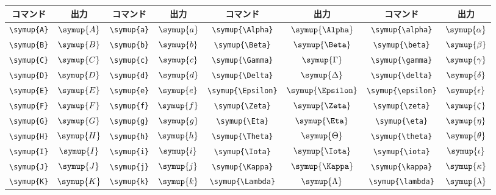 \begin{longtable}{cccccccc}
    \toprule
    コマンド         & 出力          & コマンド         & 出力          & コマンド                & 出力                 & コマンド                   & 出力                    \\
    \midrule
    \verb|\symup{A}| & \(\symup{A}\) & \verb|\symup{a}| & \(\symup{a}\) & \verb|\symup{\Alpha}|   & \(\symup{\Alpha}\)   & \verb|\symup{\alpha}|      & \(\symup{\alpha}\)      \\
    \verb|\symup{B}| & \(\symup{B}\) & \verb|\symup{b}| & \(\symup{b}\) & \verb|\symup{\Beta}|    & \(\symup{\Beta}\)    & \verb|\symup{\beta}|       & \(\symup{\beta}\)       \\
    \verb|\symup{C}| & \(\symup{C}\) & \verb|\symup{c}| & \(\symup{c}\) & \verb|\symup{\Gamma}|   & \(\symup{\Gamma}\)   & \verb|\symup{\gamma}|      & \(\symup{\gamma}\)      \\
    \verb|\symup{D}| & \(\symup{D}\) & \verb|\symup{d}| & \(\symup{d}\) & \verb|\symup{\Delta}|   & \(\symup{\Delta}\)   & \verb|\symup{\delta}|      & \(\symup{\delta}\)      \\
    \verb|\symup{E}| & \(\symup{E}\) & \verb|\symup{e}| & \(\symup{e}\) & \verb|\symup{\Epsilon}| & \(\symup{\Epsilon}\) & \verb|\symup{\epsilon}|    & \(\symup{\epsilon}\)    \\
    \verb|\symup{F}| & \(\symup{F}\) & \verb|\symup{f}| & \(\symup{f}\) & \verb|\symup{\Zeta}|    & \(\symup{\Zeta}\)    & \verb|\symup{\zeta}|       & \(\symup{\zeta}\)       \\
    \verb|\symup{G}| & \(\symup{G}\) & \verb|\symup{g}| & \(\symup{g}\) & \verb|\symup{\Eta}|     & \(\symup{\Eta}\)     & \verb|\symup{\eta}|        & \(\symup{\eta}\)        \\
    \verb|\symup{H}| & \(\symup{H}\) & \verb|\symup{h}| & \(\symup{h}\) & \verb|\symup{\Theta}|   & \(\symup{\Theta}\)   & \verb|\symup{\theta}|      & \(\symup{\theta}\)      \\
    \verb|\symup{I}| & \(\symup{I}\) & \verb|\symup{i}| & \(\symup{i}\) & \verb|\symup{\Iota}|    & \(\symup{\Iota}\)    & \verb|\symup{\iota}|       & \(\symup{\iota}\)       \\
    \verb|\symup{J}| & \(\symup{J}\) & \verb|\symup{j}| & \(\symup{j}\) & \verb|\symup{\Kappa}|   & \(\symup{\Kappa}\)   & \verb|\symup{\kappa}|      & \(\symup{\kappa}\)      \\
    \verb|\symup{K}| & \(\symup{K}\) & \verb|\symup{k}| & \(\symup{k}\) & \verb|\symup{\Lambda}|  & \(\symup{\Lambda}\)  & \verb|\symup{\lambda}|     & \(\symup{\lambda}\)     \\

\end{longtable}

